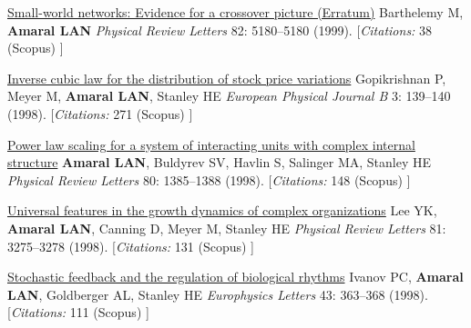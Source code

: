 \NumberedItem{\makebox[0.8cm][r]{[22]}}
\href{/people/amaral/small-world-networks-evidence-for-a-crossover-picture-vol-82-pg-3180-1999}
{Small-world networks: Evidence for a crossover picture (Erratum)}
\newline
Barthelemy M, {\textbf{Amaral LAN}}
\newline
\textit{Physical Review Letters}
    82:
5180--5180 (1999).
    [{\em{Citations:}}  38 (Scopus) ]
\newline
\Gap
~
\Gap

\NumberedItem{\makebox[0.8cm][r]{[21]}}
\href{/people/amaral/inverse-cubic-law-for-the-distribution-of-stock-price-variations}
{Inverse cubic law for the distribution of stock price variations}
\newline
Gopikrishnan P, Meyer M, {\textbf{Amaral LAN}}, Stanley HE
\newline
\textit{European Physical Journal B}
    3:
139--140 (1998).
    [{\em{Citations:}}  271 (Scopus) ]
\newline
\Gap
~
\Gap

\NumberedItem{\makebox[0.8cm][r]{[20]}}
\href{/people/amaral/power-law-scaling-for-a-system-of-interacting-units-with-complex-internal-structure}
{Power law scaling for a system of interacting units with complex internal structure}
\newline
{\textbf{Amaral LAN}}, Buldyrev SV, Havlin S, Salinger MA, Stanley HE
\newline
\textit{Physical Review Letters}
    80:
1385--1388 (1998).
    [{\em{Citations:}}  148 (Scopus) ]
\newline
\Gap
~
\Gap

\NumberedItem{\makebox[0.8cm][r]{[19]}}
\href{/people/amaral/universal-features-in-the-growth-dynamics-of-complex-organizations}
{Universal features in the growth dynamics of complex organizations}
\newline
Lee YK, {\textbf{Amaral LAN}}, Canning D, Meyer M, Stanley HE
\newline
\textit{Physical Review Letters}
    81:
3275--3278 (1998).
    [{\em{Citations:}}  131 (Scopus) ]
\newline
\Gap
~
\Gap

\NumberedItem{\makebox[0.8cm][r]{[18]}}
\href{/people/amaral/stochastic-feedback-and-the-regulation-of-biological-rhythms}
{Stochastic feedback and the regulation of biological rhythms}
\newline
Ivanov PC, {\textbf{Amaral LAN}}, Goldberger AL, Stanley HE
\newline
\textit{Europhysics Letters}
    43:
363--368 (1998).
    [{\em{Citations:}}  111 (Scopus) ]
\newline
\Gap
~
\Gap

